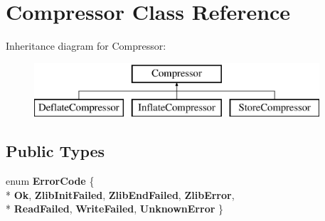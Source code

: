 \hypertarget{class_compressor}{}\section{Compressor Class Reference}
\label{class_compressor}
Inheritance diagram for Compressor\+:\begin{figure}[H]
\begin{center}
\leavevmode
\includegraphics[height=2.000000cm]{class_compressor}
\end{center}
\end{figure}
\subsection*{Public Types}
\begin{DoxyCompactItemize}
\item 
enum {\bfseries Error\+Code} \{ \\*
{\bfseries Ok}, 
{\bfseries Zlib\+Init\+Failed}, 
{\bfseries Zlib\+End\+Failed}, 
{\bfseries Zlib\+Error}, 
\\*
{\bfseries Read\+Failed}, 
{\bfseries Write\+Failed}, 
{\bfseries Unknown\+Error}
 \}\hypertarget{class_compressor_ac6712f1a2670b2a24e3a08b48eba0eb3}{}\label{class_compressor_ac6712f1a2670b2a24e3a08b48eba0eb3}

\end{DoxyCompactItemize}
